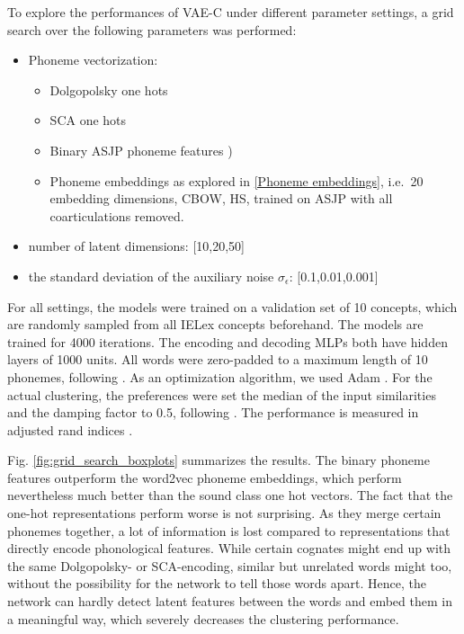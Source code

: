 \documentclass[6pt]{article}
\begin{document}
To explore the performances of VAE-C under different parameter settings, a grid search over the following parameters was performed:
\begin{itemize}
\item Phoneme vectorization:  \begin{itemize}
\item Dolgopolsky one hots \citep[subsection \ref{Hand-crafted Vectorization Models},][]{dolgopolsky1986probabilistic,list2012sca}
\item SCA one hots \citep[subsection \ref{Hand-crafted Vectorization Models},][]{list2012sca}
\item Binary ASJP phoneme features \citep[subsection \ref{Hand-crafted Vectorization Models},][]{rama2016siamese})
\item Phoneme embeddings as explored in \ref{Phoneme embeddings}, i.e.\ 20 embedding dimensions, CBOW, HS, trained on ASJP with all coarticulations removed. 
\end{itemize}
\item number of latent dimensions:  [10,20,50]
\item the standard deviation of the auxiliary noise $\sigma_{\epsilon}$: [0.1,0.01,0.001]
\end{itemize}
For all settings, the models were trained on a validation set of 10 concepts, which are randomly sampled from all IELex concepts beforehand. The models are trained for 4000 iterations. The encoding and decoding MLPs both have hidden layers of 1000 units. All words were zero-padded to a maximum length of 10 phonemes, following \cite{rama2016siamese}. As an optimization algorithm, we used Adam \citep{kingma2014adam}. For the actual clustering, the preferences were set the median of the input similarities and the damping factor to 0.5, following \cite[p. 972]{frey2007clustering}. The performance is measured in adjusted rand indices \citep{rand1971objective,hubert1985comparing}. 

Fig. \ref{fig:grid_search_boxplots} summarizes the results. The binary phoneme features outperform the word2vec phoneme embeddings, which perform nevertheless much better than the sound class one hot vectors. The fact that the one-hot representations perform worse is not surprising. As they merge certain phonemes together, a lot of information is lost compared to representations that directly encode phonological features. While certain cognates might end up with the same Dolgopolsky- or SCA-encoding, similar but unrelated words might too, without the possibility for the network to tell those words apart. Hence, the network can hardly detect latent features between the words and embed them in a meaningful way, which severely decreases the clustering performance.
\end{document}
